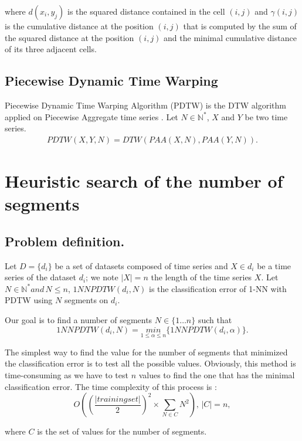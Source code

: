 where $d(x_{i},y_{j})$ is the squared distance contained in the cell $(i, j)$ and $\gamma(i, j)$ is the cumulative distance at the position $(i, j)$ that is computed by the sum of the squared distance at the position $(i, j)$ and the minimal cumulative distance of its three adjacent cells.


\subsection{Piecewise Dynamic Time Warping}

Piecewise Dynamic Time Warping Algorithm (PDTW) \cite{keogh2000scaling} is the DTW algorithm applied on Piecewise Aggregate time series \cite{Keogh2001}. Let $N\in\mathbb{N^{*}}$, $X$ and $Y$ be two time series.
\begin{eqnarray}
PDTW(X, Y, N) = DTW(PAA(X, N), PAA(Y, N)).
\end{eqnarray}


\section[Heuristic]{Heuristic search of the number of segments}
\label{sec:2}
\subsection{Problem definition.}

\begin{definition}
Let $D = \{d_i\}$ be a set of datasets composed of time series and $X \in d_i$ be a time series of
the dataset $d_i$; we note $|X| = n$ the length of the time series $X$. Let $N\in\mathbb{N}^{*} and \,N \leq n$, $1NNPDTW( d_i, N)$  is the
classification error of 1-NN with PDTW using $N$ segments on $d_i$.
\end{definition}


Our goal is to find a number of segments $N
\in \{1 \ldots n \}$ such that
\[
1NNPDTW(d_{i},N)=\underset{1\leq\alpha\leq n}{min}\{1NNPDTW(d_i,\alpha)\}.
\]


The simplest way to find the value for the number of segments that minimized the
classification error is to test all the possible values.  Obviously, this method is time-consuming as we have to test $n$ values to find the one
that has the minimal classification error. The time complexity of this process is :
\[
O((\frac{|trainingset|}{2})^{2} \times \underset{N\in C}{\sum}{\displaystyle
N^{2}}),\, |C|=n,
\]

where $C$ is the set of values for the number of segments.

